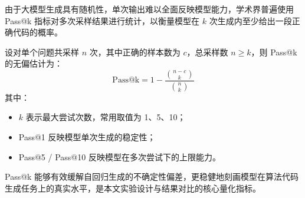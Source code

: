 
由于大模型生成具有随机性，单次输出难以全面反映模型能力，学术界普遍使用 Pass@k 指标对多次采样结果进行统计，以衡量模型在 \(k\) 次生成内至少给出一段正确代码的概率\cite{chen2021evaluating}。

设对单个问题共采样 \(n\) 次，其中正确的样本数为 \(c\)，总采样数 \(n \ge k\)，则 Pass@k 的无偏估计为：
\[
\text{Pass@k} = 1 - \frac{\binom{n - c}{k}}{\binom{n}{k}}
\]
其中：
\begin{itemize}
    \item \(k\) 表示最大尝试次数，常用取值为 1、5、10；
    \item Pass@1 反映模型单次生成的稳定性；
    \item Pass@5 / Pass@10 反映模型在多次尝试下的上限能力。
\end{itemize}

Pass@k 能够有效缓解自回归生成的不确定性偏差，更稳健地刻画模型在算法代码生成任务上的真实水平，是本文实验设计与结果对比的核心量化指标。